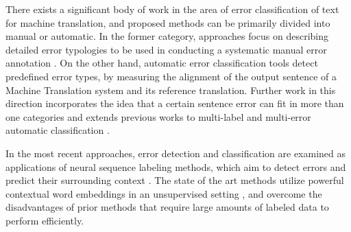 There exists a significant body of work in the area of error classification of text for machine translation, and proposed methods can be primarily divided into manual or automatic. In the former category, approaches focus on describing detailed error typologies to be used in conducting a systematic manual error annotation \cite{fishel2011automatic,vilar2006error, lommel2014multidimensional, farrus2010linguistic, costa2015linguistically}. On the other hand,  automatic error classification tools \cite{zeman2011addicter, popovic2011hjerson,popovic2015poor} detect predefined error types, by measuring the alignment of the output sentence of a Machine Translation system and its reference translation. Further work in this direction incorporates the idea that a certain sentence error can fit in more than one categories \cite{klubivcka2018quantitative, lommel2014assessing} and extends previous works to multi-label and multi-error automatic classification \citet{popovic2019automatic}. 

In the most recent approaches, error detection and classification are examined as applications of neural sequence labeling methods, which aim to detect errors and predict their surrounding context \cite{rei2017semi}. The state of the art methods utilize powerful contextual word embeddings in an unsupervised setting \cite{bell2019context}, and overcome the disadvantages of prior methods that require large amounts of labeled data to perform efficiently.